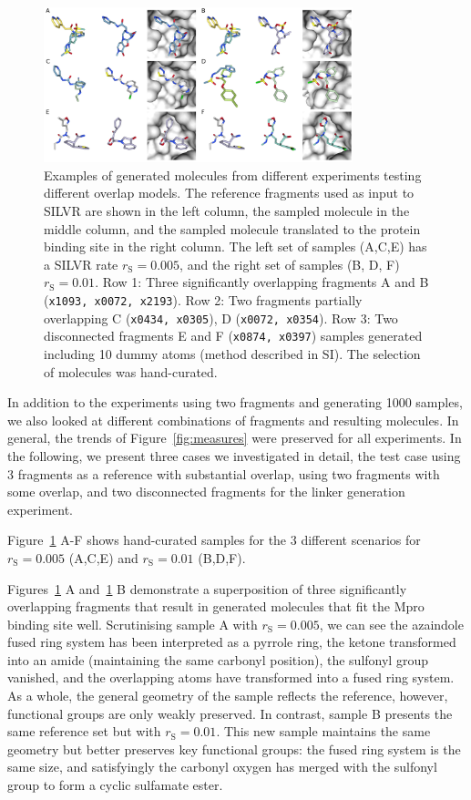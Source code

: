 \documentclass[journal=jacsat,manuscript=article]{achemso}
\begin{document}
\begin{figure}[!ht]
    \centering
    \includegraphics[width=0.8\textwidth]{paper/Figures/Fig4/fig_4_ref_sample_bound.png}
    \caption{Examples of generated molecules from different experiments testing different overlap models. The reference fragments used as input to SILVR  are shown in the left column, the sampled molecule in the middle column, and the sampled molecule translated to the protein binding site in the right column. The left set of samples (A,C,E) has a SILVR rate $r_{\mathrm{S}}=0.005$, and the right set of samples (B, D, F) $r_{\mathrm{S}}=0.01$. Row 1: Three significantly overlapping fragments A and B (\texttt{x1093, x0072, x2193}). Row 2: Two fragments partially overlapping C (\texttt{x0434, x0305}), D (\texttt{x0072, x0354}). Row 3: Two disconnected fragments E and F (\texttt{x0874, x0397}) samples generated including 10 dummy atoms (method described in SI). The selection of molecules was hand-curated.}
    \label{fig:samples}
\end{figure}

In addition to the experiments using two fragments and generating 1000 samples, we also looked at different combinations of fragments and resulting molecules. In general, the trends of Figure~\ref{fig:measures} were preserved for all experiments. In the following, we present three cases we investigated in detail, the test case using 3 fragments as a reference with substantial overlap, using two fragments with some overlap, and two disconnected fragments for the linker generation experiment. 

Figure~\ref{fig:samples} A-F shows hand-curated samples for the 3 different scenarios for $r_{\mathrm{S}}=0.005$ (A,C,E) and $r_{\mathrm{S}}=0.01$ (B,D,F).

Figures~\ref{fig:samples} A and~\ref{fig:samples} B demonstrate a superposition of three significantly overlapping fragments that result in generated molecules that fit the Mpro binding site well. Scrutinising sample A with $r_{\mathrm{S}}=0.005$, we can see the azaindole fused ring system has been interpreted as a pyrrole ring, the ketone transformed into an amide (maintaining the same carbonyl position), the sulfonyl group vanished, and the overlapping atoms have transformed into a fused ring system. As a whole, the general geometry of the sample reflects the reference, however, functional groups are only weakly preserved. In contrast, sample B presents the same reference set but with $r_{\mathrm{S}}=0.01$. This new sample maintains the same geometry but better preserves key functional groups: the fused ring system is the same size, and satisfyingly the carbonyl oxygen has merged with the sulfonyl group to form a cyclic sulfamate ester.
\end{document}
